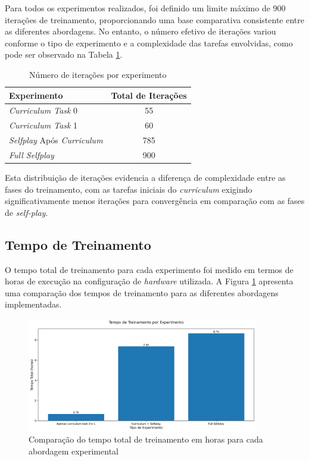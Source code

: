 Para todos os experimentos realizados, foi definido um limite máximo de 900 iterações de treinamento, proporcionando uma base comparativa consistente entre as diferentes abordagens. No entanto, o número efetivo de iterações variou conforme o tipo de experimento e a complexidade das tarefas envolvidas, como pode ser observado na Tabela \ref{tab:iteracoes_experimentos}.

\begin{table}[h]
    \centering
    \caption{Número de iterações por experimento}
    \label{tab:iteracoes_experimentos}
    \begin{tabular}{|l|c|}
        \hline
        \textbf{Experimento} & \textbf{Total de Iterações} \\
        \hline
        \textit{Curriculum Task} 0 & 55 \\
        \textit{Curriculum Task} 1 & 60 \\
        \textit{Selfplay} Após \textit{Curriculum} & 785 \\
        \textit{Full Selfplay} & 900 \\
        \hline
    \end{tabular}
\end{table}

Esta distribuição de iterações evidencia a diferença de complexidade entre as fases do treinamento, com as tarefas iniciais do \textit{curriculum} exigindo significativamente menos iterações para convergência em comparação com as fases de \textit{self-play}.

\subsection{Tempo de Treinamento}

O tempo total de treinamento para cada experimento foi medido em termos de horas de execução na configuração de \textit{hardware} utilizada. A Figura \ref{fig:tempo_treinamento} apresenta uma comparação dos tempos de treinamento para as diferentes abordagens implementadas.

\begin{figure}[H]
    \centering
    \includegraphics[width=0.9\textwidth]{fig/graficos_trabalho/graficos_experimentos/graficos_tempo_treino/tempo_treinamento.png}
    \caption{Comparação do tempo total de treinamento em horas para cada abordagem experimental}
    \label{fig:tempo_treinamento}
\end{figure}

